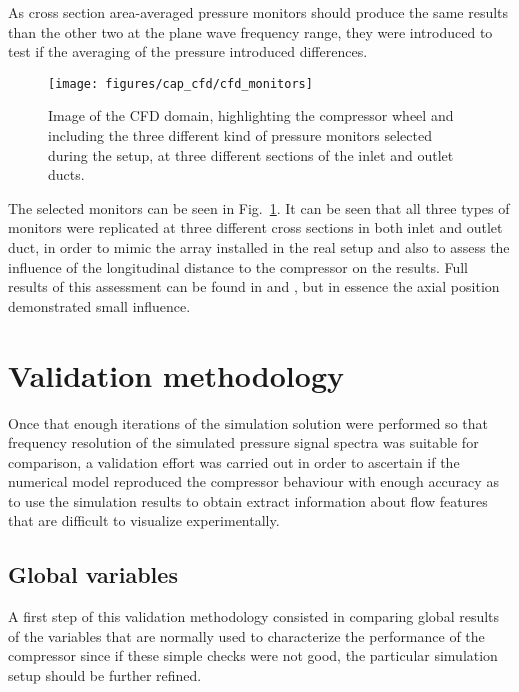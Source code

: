 As cross section area-averaged pressure monitors should produce the same results than the other two at the plane wave frequency range, they were introduced to test if the averaging of the pressure introduced differences.

\begin{figure}
\centering
\texttt{[image: figures/cap\_cfd/cfd\_monitors]}
\caption[Image of the CFD domain with different monitors]{Image of the CFD domain, highlighting the compressor wheel and including the three different kind of pressure monitors selected during the setup, at three different sections of the inlet and outlet ducts.}
\label{fig:cfd_monitors}
\end{figure}

The selected monitors can be seen in Fig.~\ref{fig:cfd_monitors}. It can be seen that all three types of monitors were replicated at three different cross sections in both inlet and outlet duct, in order to mimic the array installed in the real setup and also to assess the influence of the longitudinal distance to the compressor on the results. Full results of this assessment can be found in \cite{broatch2014methodology} and \cite{navarro2014numerical}, but in essence the axial position demonstrated small influence. 

\section{Validation methodology}

Once that enough iterations of the simulation solution were performed so that frequency resolution of the simulated pressure signal spectra was suitable for comparison, a validation effort was carried out in order to ascertain if the numerical model reproduced the compressor behaviour with enough accuracy as to use the simulation results to obtain extract information about flow features that are difficult to visualize experimentally.   

\subsection{Global variables}

A first step of this validation methodology consisted in comparing global results of the variables that are normally used to characterize the performance of the compressor since if these simple checks were not good, the particular simulation setup should be  further refined.

